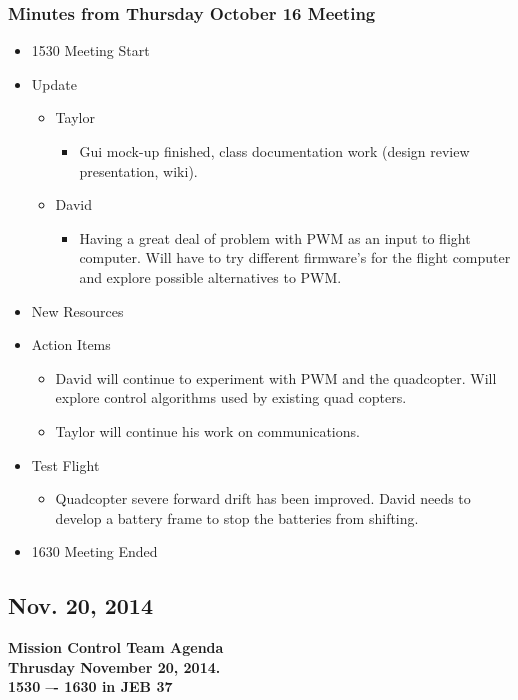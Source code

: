 \documentclass[pdftex,11pt]{article}
\begin{document}
\subsubsection[short]{Minutes from Thursday October 16 Meeting}
\begin{itemize}
	\item 1530 \indent Meeting Start
	\item Update
	\begin{itemize}
		\item Taylor
		\begin{itemize}
			\item Gui mock-up finished, class documentation work (design review presentation, wiki).
		\end{itemize}
		\item David
		\begin{itemize}
			\item  Having a great deal of problem with PWM as an input to flight computer.   Will have to try different firmware's for the flight computer and explore possible alternatives to PWM.
		\end{itemize}
	\end{itemize}
	\item New Resources
	\\
	\item Action Items
	\begin{itemize}
		\item David will continue to experiment with PWM and the quadcopter.   Will explore control algorithms used by existing quad copters.
		\item Taylor will continue his work on communications.
	\end{itemize}
	\item Test Flight
	\begin{itemize}
		\item  Quadcopter severe forward drift has been improved. David needs to develop a battery frame to stop the batteries from shifting.
	\end{itemize}
	\item 1630 \indent Meeting Ended
\end{itemize}	


\clearpage


\subsection{Nov. 20, 2014}
{ \huge \bfseries Mission Control Team Agenda \\[0.4cm] }
{ \huge \bfseries Thrusday November 20, 2014.\\1530 –-  1630  in JEB 37\\[0.4cm] }
\vspace*{2.5mm}
\end{document}
